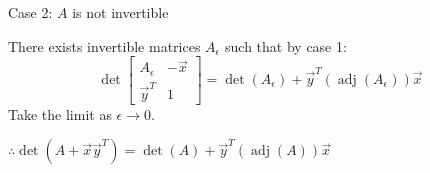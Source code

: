 \documentclass[letterpaper,12pt,fleqn]{article}
\DeclareMathOperator{\adj}{adj}
\newcommand{\e}{\epsilon}
\newcommand{\vx}{\vec{x}}
\newcommand{\vy}{\vec{y}}
\begin{document}
\begin{theproof}
\begin{description}
  \item Case 2: $A$ is not invertible

    There exists invertible matrices $A_{\e}$ such that by case 1:
    \[\det\begin{bmatrix} A_{\e} & -\vx \\ \vy^T & 1 \end{bmatrix}=
    \det(A_{\e})+\vy^T(\adj(A_{\e}))\vx\]
    Take the limit as $\e\to0$.
  \end{description}
  $\therefore \det(A+\vx\vy^T)=\det(A)+\vy^T(\adj(A))\vx$
\end{theproof}
\end{document}
